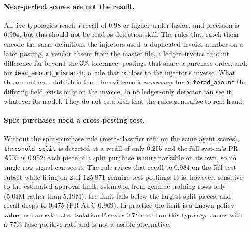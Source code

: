 \documentclass{article}
\newcommand{\typ}[1]{\texttt{#1}}
\begin{document}
\paragraph{Near-perfect scores are not the result.} All five typologies reach a recall of 0.98 or higher under fusion, and precision is 0.994, but this should not be read as detection skill. The rules that catch them encode the same definitions the injectors used: a duplicated invoice number on a later posting, a vendor absent from the master file, a ledger--invoice amount difference far beyond the 3\% tolerance, postings that share a purchase order, and, for \typ{desc\_amount\_mismatch}, a rule that is close to the injector's inverse. What these numbers establish is that the evidence is \emph{necessary}: for \typ{altered\_amount} the differing field exists only on the invoice, so no ledger-only detector can see it, whatever its model. They do not establish that the rules generalise to real fraud.

\paragraph{Split purchases need a cross-posting test.} Without the split-purchase rule (meta-classifier refit on the same agent scores), \typ{threshold\_split} is detected at a recall of only 0.205 and the full system's PR-AUC is 0.952: each piece of a split purchase is unremarkable on its own, so no single-row signal can see it. The rule raises that recall to 0.984 on the full test subset while firing on 2 of 125,871 genuine test postings. It is, however, sensitive to the estimated approval limit: estimated from genuine training rows only (5.04M rather than 5.19M), the limit falls below the largest split pieces, and recall drops to 0.475 (PR-AUC 0.969). In practice the limit is a known policy value, not an estimate. Isolation Forest's 0.78 recall on this typology comes with a 77\% false-positive rate and is not a usable alternative.
\end{document}
